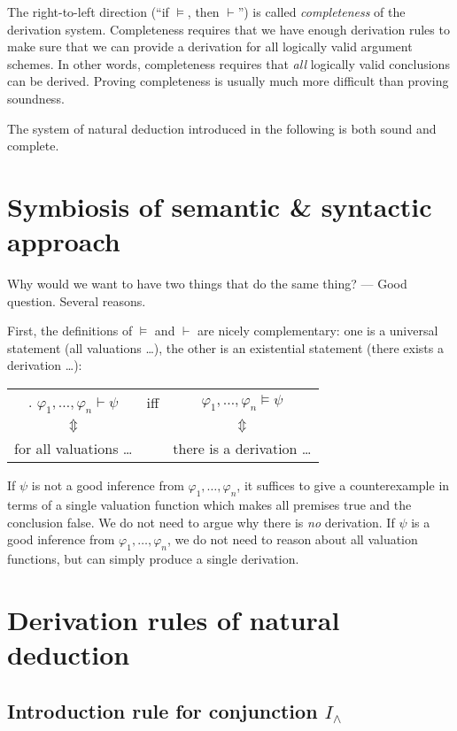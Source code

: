 \documentclass[nobib,nofonts]{tufte-handout}
\begin{document}
The right-to-left direction (``if $\models$, then $\vdash$'') is called \emph{completeness} of the derivation system.
Completeness requires that we have enough derivation rules to make sure that we can provide a derivation for all logically valid argument schemes.
In other words, completeness requires that \emph{all} logically valid conclusions can be derived.
Proving completeness is usually much more difficult than proving soundness.

The system of natural deduction introduced in the following is both sound and complete.

\section{Symbiosis of semantic \& syntactic approach}

Why would we want to have two things that do the same thing? ---
Good question.
Several reasons.

First, the definitions of $\models$ and $\vdash$ are nicely complementary: one is a universal statement (all valuations \dots), the other is an existential statement (there exists a derivation \dots):

\begin{center}
  \begin{tabular}{ccc}.
    $\varphi_{1}, \dots, \varphi_{n} \vdash \psi$ &
    iff &
    $\varphi_{1}, \dots, \varphi_{n} \models \psi$ \\
    $\Updownarrow$ & & $\Updownarrow$ \\
    for all valuations \dots && there is a derivation \dots
  \end{tabular}
\end{center}

If $\psi$ is not a good inference from $\varphi_{1}, \dots, \varphi_{n}$, it suffices to give a counterexample in terms of a single valuation function which makes all premises true and the conclusion false.
We do not need to argue why there is \emph{no} derivation.
If $\psi$ is a good inference from $\varphi_{1}, \dots, \varphi_{n}$, we do not need to reason about all valuation functions, but can simply produce a single derivation.

\section{Derivation rules of natural deduction}

\subsection{Introduction rule for conjunction $I_{\wedge}$}
\end{document}
